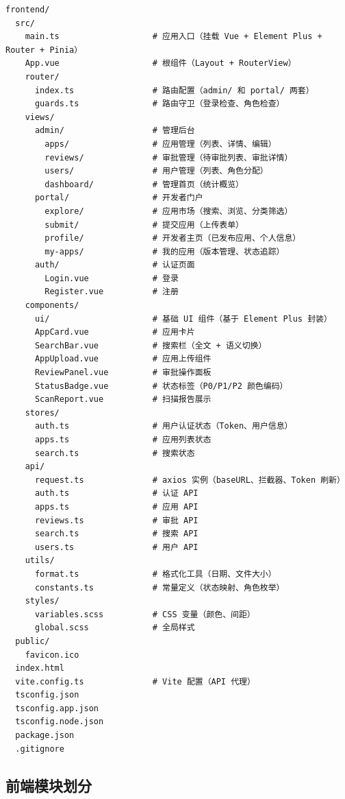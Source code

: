 \documentclass[11pt,a4paper]{article}
\begin{document}
\begin{lstlisting}[basicstyle=\ttfamily\footnotesize, frame=single]
frontend/
  src/
    main.ts                   # 应用入口（挂载 Vue + Element Plus + Router + Pinia）
    App.vue                   # 根组件（Layout + RouterView）
    router/
      index.ts                # 路由配置（admin/ 和 portal/ 两套）
      guards.ts               # 路由守卫（登录检查、角色检查）
    views/
      admin/                  # 管理后台
        apps/                 # 应用管理（列表、详情、编辑）
        reviews/              # 审批管理（待审批列表、审批详情）
        users/                # 用户管理（列表、角色分配）
        dashboard/            # 管理首页（统计概览）
      portal/                 # 开发者门户
        explore/              # 应用市场（搜索、浏览、分类筛选）
        submit/               # 提交应用（上传表单）
        profile/              # 开发者主页（已发布应用、个人信息）
        my-apps/              # 我的应用（版本管理、状态追踪）
      auth/                   # 认证页面
        Login.vue             # 登录
        Register.vue          # 注册
    components/
      ui/                     # 基础 UI 组件（基于 Element Plus 封装）
      AppCard.vue             # 应用卡片
      SearchBar.vue           # 搜索栏（全文 + 语义切换）
      AppUpload.vue           # 应用上传组件
      ReviewPanel.vue         # 审批操作面板
      StatusBadge.vue         # 状态标签（P0/P1/P2 颜色编码）
      ScanReport.vue          # 扫描报告展示
    stores/
      auth.ts                 # 用户认证状态（Token、用户信息）
      apps.ts                 # 应用列表状态
      search.ts               # 搜索状态
    api/
      request.ts              # axios 实例（baseURL、拦截器、Token 刷新）
      auth.ts                 # 认证 API
      apps.ts                 # 应用 API
      reviews.ts              # 审批 API
      search.ts               # 搜索 API
      users.ts                # 用户 API
    utils/
      format.ts               # 格式化工具（日期、文件大小）
      constants.ts            # 常量定义（状态映射、角色枚举）
    styles/
      variables.scss          # CSS 变量（颜色、间距）
      global.scss             # 全局样式
  public/
    favicon.ico
  index.html
  vite.config.ts              # Vite 配置（API 代理）
  tsconfig.json
  tsconfig.app.json
  tsconfig.node.json
  package.json
  .gitignore
\end{lstlisting}

\subsection{前端模块划分}
\end{document}
